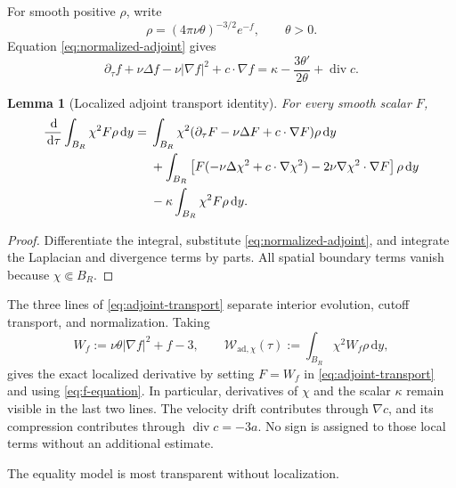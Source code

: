\documentclass[11pt]{amsart}
\numberwithin{equation}{section}
\theoremstyle{plain}
\newtheorem{lemma}[lemma]{Lemma}
\theoremstyle{definition}
\theoremstyle{remark}
\newcommand{\dd}{\,\mathrm d}
\newcommand{\diver}{\operatorname{div}}
\begin{document}
For smooth positive \(\rho\), write
\begin{equation}\label{eq:f-def}
 \rho=(4\pi\nu\theta)^{-3/2}e^{-f},
 \qquad \theta>0.
\end{equation}
Equation \eqref{eq:normalized-adjoint} gives
\begin{equation}\label{eq:f-equation}
 \partial_\tau f+\nu\Delta f-\nu|\nabla f|^2+c\cdot\nabla f
 =\kappa-\frac{3\theta'}{2\theta}+\diver c.
\end{equation}

\begin{lemma}[Localized adjoint transport identity]
\label{lem:adjoint-transport}
For every smooth scalar \(F\),
\begin{align}
 \frac{\dd}{\dd\tau}\int_{B_R}\chi^2F\rho\dd y
 ={}&\int_{B_R}\chi^2
 (\partial_\tau F-\nu\Delta F+c\cdot\nabla F)\rho\dd y
 \notag\\
 &+\int_{B_R}
 \left[F(-\nu\Delta\chi^2+c\cdot\nabla\chi^2)
       -2\nu\nabla\chi^2\cdot\nabla F\right]\rho\dd y
 \notag\\
 &-\kappa\int_{B_R}\chi^2F\rho\dd y.
 \label{eq:adjoint-transport}
\end{align}
\end{lemma}

\begin{proof}
Differentiate the integral, substitute
\eqref{eq:normalized-adjoint}, and integrate the Laplacian and divergence
terms by parts.  All spatial boundary terms vanish because
\(\chi\Subset B_R\).
\end{proof}

The three lines of \eqref{eq:adjoint-transport} separate interior evolution,
cutoff transport, and normalization.  Taking
\begin{equation}\label{eq:adjoint-W-density}
 W_f:=\nu\theta|\nabla f|^2+f-3,
 \qquad
 \mathcal W_{\mathrm{ad},\chi}(\tau)
 :=\int_{B_R}\chi^2W_f\rho\dd y,
\end{equation}
gives the exact localized derivative by setting \(F=W_f\) in
\eqref{eq:adjoint-transport} and using \eqref{eq:f-equation}.  In
particular, derivatives of \(\chi\) and the scalar \(\kappa\) remain visible
in the last two lines.  The velocity drift contributes through
\(\nabla c\), and its compression contributes through \(\diver c=-3a\).
No sign is assigned to those local terms without an additional estimate.

The equality model is most transparent without localization.
\end{document}
